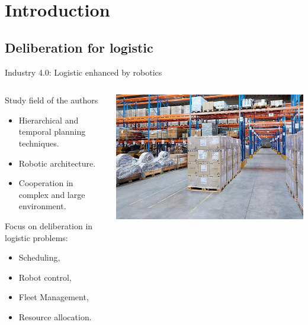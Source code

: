 \section{Introduction}
\subsection{Deliberation for logistic}

\begin{frame}{Industry 4.0: Logistic enhanced by robotics}
    \centering
\begin{columns}
    \begin{column}{0.5\textwidth}
        Study field of the authors 
        \small
        \begin{itemize}
            \item Hierarchical and temporal planning techniques.
            \item Robotic architecture.
            \item Cooperation in complex and large environment.
        \end{itemize}
        Focus on deliberation in logistic problems: 
        \small
        \begin{itemize}
            \item Scheduling,
            \item Robot control,
            \item Fleet Management,
            \item Resource allocation.
        \end{itemize}
    \end{column}
    \begin{column}{0.5\textwidth}
        \includegraphics[width = \textwidth]{images/logisticsolutions.jpg}
    \end{column}
\end{columns}
\end{frame}



